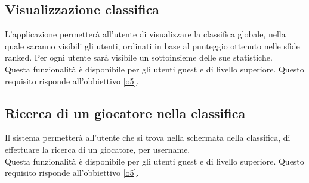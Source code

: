 \subsection{Visualizzazione classifica} \label{req_visualizza_classifica}
L'applicazione permetterà all'utente di visualizzare la classifica globale, nella quale saranno visibili gli utenti, ordinati in base al punteggio ottenuto nelle sfide ranked. Per ogni utente sarà visibile un sottoinsieme delle sue statistiche. \\
Questa funzionalità è disponibile per gli utenti guest e di livello superiore. Questo requisito risponde all'obbiettivo \ref{o5}.

\subsection{Ricerca di un giocatore nella classifica} \label{req_ricerca_classifica}
Il sistema permetterà all'utente che si trova nella schermata della classifica, di effettuare la ricerca di un giocatore, per username. \\
Questa funzionalità è disponibile per gli utenti guest e di livello superiore. Questo requisito risponde all'obbiettivo \ref{o5}.

